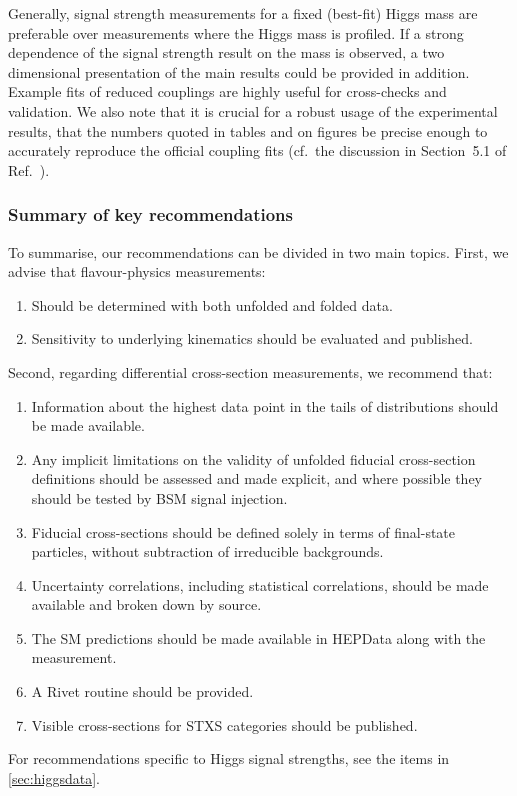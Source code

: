 \documentclass[a4paper,aps,prd,longbibliography,notitlepage,showpacs,amsmath,amssymb,superscriptaddress,nofootinbib,floatfix,11pt,preprintnumbers]{revtex4-1-mod}
\newcommand{\hepdata}{\textsf{HEPData}\xspace}
\newcommand{\rivet}{\textsf{Rivet}\xspace}
\newcommand{\cf}{cf.\xspace}
\begin{document}
Generally, signal strength measurements for a fixed (best-fit) Higgs mass are preferable over measurements where the Higgs mass is profiled. If a strong dependence of the signal strength result on the mass is observed, a two dimensional presentation of the main results could be provided in addition.
Example fits of reduced couplings are highly useful for cross-checks and validation.
We also note that it is crucial for a robust usage of the experimental results, that the numbers quoted in tables and on
figures be precise enough to accurately reproduce the official coupling fits (\cf~the discussion in Section~5.1 of Ref.~\cite{Kraml:2019sis}).


\subsubsection{Summary of key recommendations}

\noindent To summarise, our recommendations can be divided in two main topics. First,  we advise that flavour-physics measurements:

\begin{enumerate}
\item Should be determined with both unfolded and folded data.
\item Sensitivity to underlying kinematics should be evaluated and published.
\end{enumerate}

\noindent
Second, regarding differential cross-section measurements, we recommend that:

\begin{enumerate}
\item Information about the highest data point in the tails of distributions should be made available.
\item Any implicit limitations on the validity of unfolded fiducial cross-section definitions should be assessed and made explicit, and where possible they should be tested by BSM signal injection.
\item Fiducial cross-sections should be defined solely in terms of final-state particles, without subtraction of irreducible backgrounds.
\item Uncertainty correlations, including statistical correlations, should be made available and broken down by source.
\item The SM predictions should be made available in \hepdata along with the measurement.
\item A \rivet routine should be provided.
\item Visible cross-sections for STXS categories should be published.
\end{enumerate}
For recommendations specific to Higgs signal strengths, see the items in \ref{sec:higgsdata}.
\end{document}
